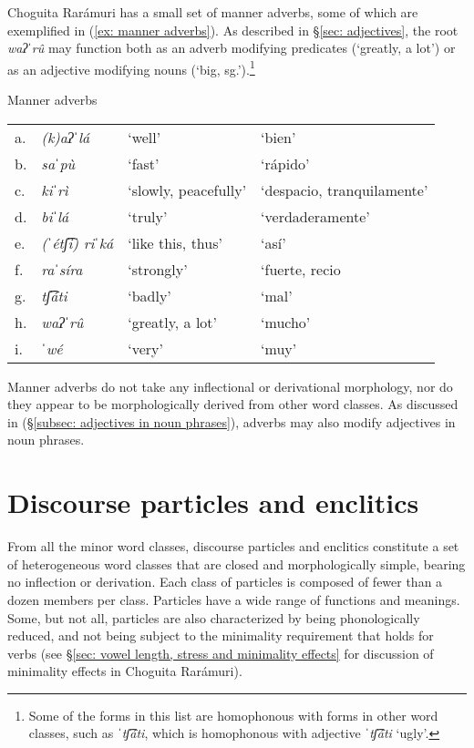 Choguita Rarámuri has a small set of manner adverbs, some of which are exemplified in (\ref{ex: manner adverbs}). As described in §\ref{sec: adjectives}, the root \textit{waʔˈrû} may function both as an adverb modifying predicates (`greatly, a lot') or as an adjective modifying nouns (`big, sg.').\footnote{Some of the forms in this list are homophonous with forms in other word classes, such as \textit{ˈtʃ͡áti}, which is homophonous with adjective \textit{ˈtʃ͡áti} `ugly'.}

\ea\label{ex: manner adverbs}
{Manner adverbs}

\begin{tabular}{llll}
    a. & {\textit{(k)aʔˈlá}}&{`well'}& {`bien'}\\
    b. & {\textit{saˈpù}}&{`fast'}& {`rápido'}\\
    c. & {\textit{kiˈrì}}&{`slowly, peacefully'} &{`despacio, tranquilamente'}\\
    d. & {\textit{biˈlá}}&{`truly'} &{`verdaderamente'}\\
    e. & {\textit{(ˈétʃ͡i) riˈká}}&{`like this, thus'}&{`así'}\\
    f. & {\textit{raˈsíra}}&{`strongly'}&{`fuerte, recio}\\
    g. & {\textit{tʃ͡áti}}&{`badly'}&{`mal'}\\
    h. & {\textit{waʔˈrû}}&{`greatly, a lot'}&`{mucho'}\\
    i. & {\textit{ˈwé}}&{`very'}& {`muy'}\\
\end{tabular}
    \z

Manner adverbs do not take any inflectional or derivational morphology, nor do they appear to be morphologically derived from other word classes. As discussed in  (§\ref{subsec: adjectives in noun phrases}), adverbs may also modify adjectives in noun phrases.

\section{Discourse particles and enclitics}
\label{sec: particles and clitics}

From all the minor word classes, discourse particles and enclitics constitute a set of heterogeneous word classes that are closed and morphologically simple, bearing no inflection or derivation. Each class of particles is composed of fewer than a dozen members per class. Particles have a wide range of functions and meanings. Some, but not all, particles are also characterized by being phonologically reduced, and not being subject to the minimality requirement that holds for verbs (see §\ref{sec: vowel length, stress and minimality effects} for discussion of minimality effects in Choguita Rarámuri).


